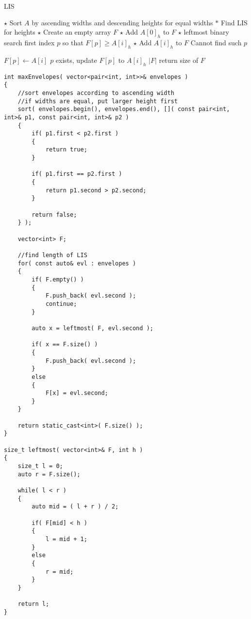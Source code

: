 \setcounter{algorithm}{0}
\begin{algorithm}[H]
\caption{LIS}
\begin{algorithmic}[1]
\State $\star$ Sort $A$ by ascending widths and descending heights for equal widths
\State $\ast$ Find LIS for heights
\State $\star$ Create an empty array $F$ 
\State $\star$ Add $A[0]_h$ to $F$
\State $\star$ leftmost binary search first index $p$ so that $F[p]\geq A[i]_h$
\State $\star$ Add $A[i]_h$ to $F$ \Comment Cannot find such $p$
\end{algorithmic}
\end{algorithm}
\begin{algorithm}[H]
\begin{algorithmic}[1]
\Else
\State $F[p]\gets A[i]$ \Comment $p$ exists, update $F[p]$ to $ A[i]_h $
\EndIf
\EndFor
\State \Return $ \lvert F\rvert $ \Comment return size of $F$
\EndProcedure
\end{algorithmic}
\end{algorithm}

\setcounter{lstlisting}{0}
\begin{lstlisting}[style=customc, caption={LIS}]
int maxEnvelopes( vector<pair<int, int>>& envelopes )
{
    //sort envelopes according to ascending width
    //if widths are equal, put larger height first
    sort( envelopes.begin(), envelopes.end(), []( const pair<int, int>& p1, const pair<int, int>& p2 )
    {
        if( p1.first < p2.first )
        {
            return true;
        }

        if( p1.first == p2.first )
        {
            return p1.second > p2.second;
        }

        return false;
    } );

    vector<int> F;

    //find length of LIS
    for( const auto& evl : envelopes )
    {
        if( F.empty() )
        {
            F.push_back( evl.second );
            continue;
        }

        auto x = leftmost( F, evl.second );

        if( x == F.size() )
        {
            F.push_back( evl.second );
        }
        else
        {
            F[x] = evl.second;
        }
    }

    return static_cast<int>( F.size() );
}

size_t leftmost( vector<int>& F, int h )
{
    size_t l = 0;
    auto r = F.size();

    while( l < r )
    {
        auto mid = ( l + r ) / 2;

        if( F[mid] < h )
        {
            l = mid + 1;
        }
        else
        {
            r = mid;
        }
    }

    return l;
}

\end{lstlisting}